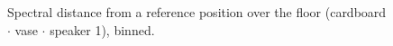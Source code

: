 \begin{figure}[t]
\centering

\caption{Spectral distance from a reference position over the floor (cardboard $\cdot$ vase $\cdot$ speaker 1), binned.}
\label{fig:spectral_distance_vase_binned}
\end{figure}
